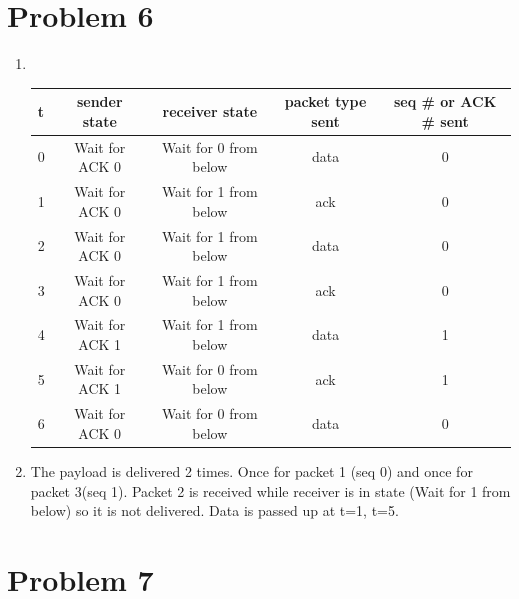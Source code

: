 \documentclass[letter,10pt]{article}
\begin{document}
\section{Problem 6}

\begin{enumerate}[label=\alph*.]
	\item ~
	\begin{table} [h]
		\centering
		\begin{tabular}{|l|c|c|c|c|}
			\hline
			t & sender state   & receiver state        & packet type sent & seq \# or ACK \# sent \\ \hline
			0 & Wait for ACK 0 & Wait for 0 from below & data             & 0                     \\ \hline
			1 & Wait for ACK 0 & Wait for 1 from below & ack              & 0                     \\ \hline
			2 & Wait for ACK 0 & Wait for 1 from below & data             & 0                     \\ \hline
			3 & Wait for ACK 0 & Wait for 1 from below & ack              & 0                     \\ \hline
			4 & Wait for ACK 1 & Wait for 1 from below & data             & 1                     \\ \hline
			5 & Wait for ACK 1 & Wait for 0 from below & ack              & 1                     \\ \hline
			6 & Wait for ACK 0 & Wait for 0 from below & data             & 0                     \\ \hline
		\end{tabular}
	\end{table}

	\item The payload is delivered 2 times. Once for packet 1 (seq 0) and once for packet 3(seq 1). Packet 2 is received while receiver is in state (Wait for 1 from below) so it is not delivered. Data is passed up at t=1, t=5.
	
\end{enumerate}

\section{Problem 7}
\end{document}

